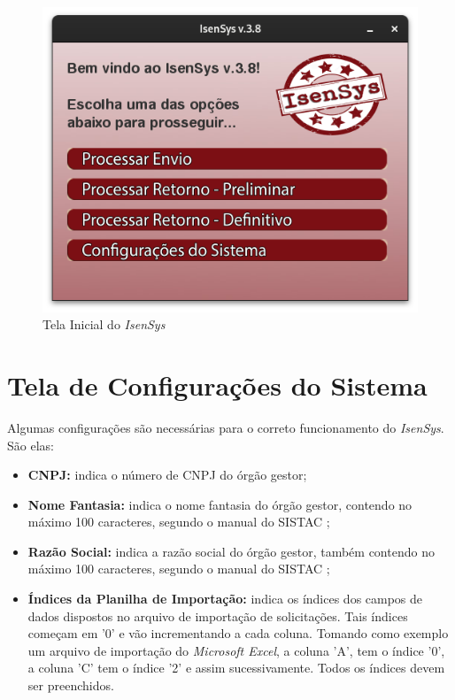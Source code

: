 \documentclass[
	12pt,			%
	openright,		%
	oneside,	
	a4paper,		%
	english,		%
	brazil			%
]{abntex2/abntex2}  %
\begin{document}
			\begin{figure}[h]
				\begin{center}
					
					\caption{Tela Inicial do \textit{IsenSys}}
					\label{tela-inicial-img}
					
					\includegraphics[scale=0.5]{img/inicial}
					
				\end{center}
			\end{figure}

		\section{Tela de Configurações do Sistema}
		
			Algumas configurações são necessárias para o correto funcionamento do \textit{IsenSys}. São elas:
			
			\begin{itemize}
				
				\item \textbf{CNPJ:} indica o número de CNPJ do órgão gestor;
				\item \textbf{Nome Fantasia:} indica o nome fantasia do órgão gestor, contendo no máximo 100 caracteres, segundo o manual do SISTAC \cite{sistac-formatos};
				\item \textbf{Razão Social:} indica a razão social do órgão gestor, também contendo no máximo 100 caracteres, segundo o manual do SISTAC \cite{sistac-formatos};
				\item \textbf{Índices da Planilha de Importação:} indica os índices dos campos de dados dispostos no arquivo de importação de solicitações. Tais índices começam em '0' e vão incrementando a cada coluna. Tomando como exemplo um arquivo de importação do \textit{Microsoft Excel}, a coluna 'A', tem o índice '0', a coluna 'C' tem o índice '2' e assim sucessivamente. Todos os índices devem ser preenchidos.
				
			\end{itemize}
			
\end{document}
